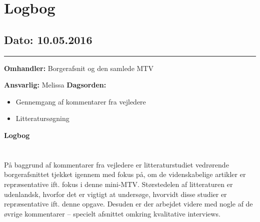 \chapter{Logbog}

\section{Dato: 10.05.2016}
\hrule

\textbf{Omhandler:} Borgerafsnit og den samlede MTV


\textbf{Ansvarlig:} Melissa
\textbf{Dagsorden:}
\begin{itemize}
	\item Gennemgang af kommentarer fra vejledere
	\item Litteratursøgning 
\end{itemize}

\textbf{Logbog}
\\
\\ \\
På baggrund af kommentarer fra vejledere er litteraturstudiet vedrørende borgerafsnittet tjekket igennem med fokus på, om de videnskabelige artikler er repræsentative ift. fokus i denne mini-MTV. Størstedelen af litteraturen er udenlandsk, hvorfor det er vigtigt at undersøge, hvorvidt disse studier er repræsentative ift. denne opgave. Desuden er der arbejdet videre med nogle af de øvrige kommentarer – specielt afsnittet omkring kvalitative interviews. 